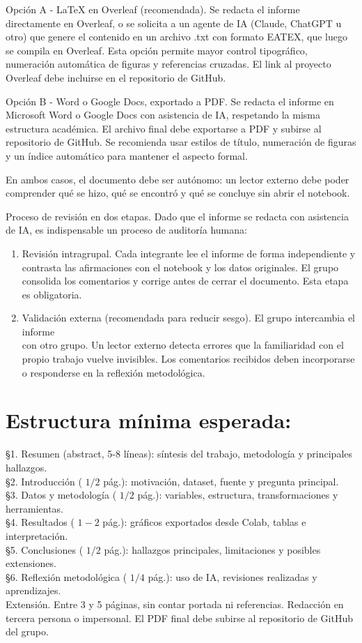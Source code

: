 \documentclass[10pt]{article}
\begin{document}
Opción A - LaTeX en Overleaf (recomendada). Se redacta el informe directamente en Overleaf, o se solicita a un agente de IA (Claude, ChatGPT u otro) que genere el contenido en un archivo .txt con formato EATEX, que luego se compila en Overleaf. Esta opción permite mayor control tipográfico, numeración automática de figuras y referencias cruzadas. El link al proyecto Overleaf debe incluirse en el repositorio de GitHub.

Opción B - Word o Google Docs, exportado a PDF. Se redacta el informe en Microsoft Word o Google Docs con asistencia de IA, respetando la misma estructura académica. El archivo final debe exportarse a PDF y subirse al repositorio de GitHub. Se recomienda usar estilos de título, numeración de figuras y un índice automático para mantener el aspecto formal.

En ambos casos, el documento debe ser autónomo: un lector externo debe poder comprender qué se hizo, qué se encontró y qué se concluye sin abrir el notebook.

Proceso de revisión en dos etapas. Dado que el informe se redacta con asistencia de IA, es indispensable un proceso de auditoría humana:

\begin{enumerate}
  \item Revisión intragrupal. Cada integrante lee el informe de forma independiente y contrasta las afirmaciones con el notebook y los datos originales. El grupo consolida los comentarios y corrige antes de cerrar el documento. Esta etapa es obligatoria.
  \item Validación externa (recomendada para reducir sesgo). El grupo intercambia el informe\\
con otro grupo. Un lector externo detecta errores que la familiaridad con el propio trabajo vuelve invisibles. Los comentarios recibidos deben incorporarse o responderse en la reflexión metodológica.
\end{enumerate}

\section*{Estructura mínima esperada:}
§1. Resumen (abstract, 5-8 líneas): síntesis del trabajo, metodología y principales hallazgos.\\
§2. Introducción ( $1 / 2$ pág.): motivación, dataset, fuente y pregunta principal.\\
§3. Datos y metodología ( $1 / 2$ pág.): variables, estructura, transformaciones y herramientas.\\
§4. Resultados ( $1-2$ pág.): gráficos exportados desde Colab, tablas e interpretación.\\
§5. Conclusiones ( $1 / 2$ pág.): hallazgos principales, limitaciones y posibles extensiones.\\
§6. Reflexión metodológica ( $1 / 4$ pág.): uso de IA, revisiones realizadas y aprendizajes.\\
Extensión. Entre 3 y 5 páginas, sin contar portada ni referencias. Redacción en tercera persona o impersonal. El PDF final debe subirse al repositorio de GitHub del grupo.
\end{document}
